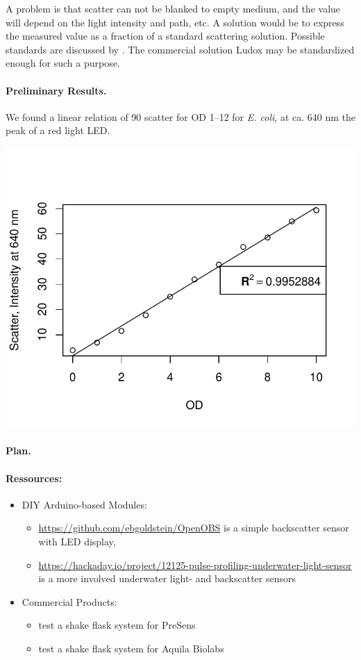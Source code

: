 \documentclass[12pt,a4paper]{scrartcl}
\begin{document}
A problem is that scatter can not be blanked to empty medium, and the
value will depend on the light intensity and path, etc. A solution
would be to express the measured value as a fraction of a standard
scattering solution. Possible standards are discussed by
 \cite{Buffone1976}. The commercial solution Ludox may be standardized
enough for such a purpose.

\paragraph{Preliminary Results.}
We found a linear relation of 90\textdegree{} scatter for OD 1--12 for
\textit{E. coli}, at ca. 640 nm the peak of a red light LED.

\includegraphics[width=.4\textwidth]{../data/scatter_test1.pdf}

\paragraph{Plan.}

\paragraph{Ressources:}
\begin{itemize}
\item DIY Arduino-based Modules:
  \begin{itemize}
  \item \url{https://github.com/ebgoldstein/OpenOBS} is a simple
    backscatter sensor with LED display, 
  \item \url{https://hackaday.io/project/12125-pulse-profiling-underwater-light-sensor}
    is a more involved underwater light- and backscatter sensors
  \end{itemize}
\item Commercial Products:
  \begin{itemize}
  \item \cite{Ude2014} test a shake flask system for PreSens
  \item \cite{Bruder2016} test a shake flask system for Aquila Biolabs
  \end{itemize}
\end{itemize}
\end{document}
